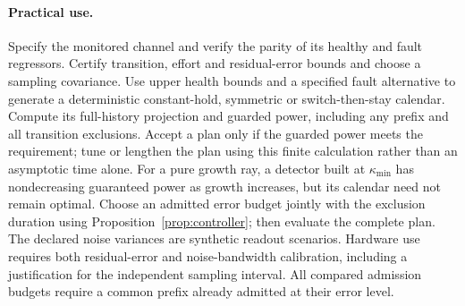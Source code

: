 \paragraph{Practical use.}
Specify the monitored channel and verify the parity of its healthy and fault regressors. Certify transition, effort and residual-error bounds and choose a sampling covariance. Use upper health bounds and a specified fault alternative to generate a deterministic constant-hold, symmetric or switch-then-stay calendar. Compute its full-history projection and guarded power, including any prefix and all transition exclusions. Accept a plan only if the guarded power meets the requirement; tune or lengthen the plan using this finite calculation rather than an asymptotic time alone. For a pure growth ray, a detector built at $\kappa_{\min}$ has nondecreasing guaranteed power as growth increases, but its calendar need not remain optimal. Choose an admitted error budget jointly with the exclusion duration using Proposition~\ref{prop:controller}; then evaluate the complete plan. The declared noise variances are synthetic readout scenarios. Hardware use requires both residual-error and noise-bandwidth calibration, including a justification for the independent sampling interval. All compared admission budgets require a common prefix already admitted at their error level.
